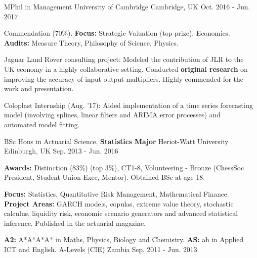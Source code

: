 

\begin{cventries}
  \cventry
    {MPhil in Management} %
    {University of Cambridge} %
    {Cambridge, UK} %
    {Oct. 2016 - Jun. 2017} %
    {
      \begin{cvitems} %
        \item {Commendation (70\%). \textbf{Focus:} Strategic Valuation (top prize), Economics. \textbf{Audits:} Measure Theory, Philosophy of Science, Physics.}
        \item {Jaguar Land Rover consulting project: Modeled the contribution of JLR to the UK economy in a highly collaborative setting. Conducted \textbf{original research} on improving the accuracy of input-output multipliers. Highly commended for the work and presentation.}
        \item {Coloplast Internship (Aug. '17): Aided implementation of a time series forecasting model (involving splines, linear filters and ARIMA error processes) and automated model fitting.}
      \end{cvitems}
    }

  \cventry
    {BSc Hons in Actuarial Science, \textbf{Statistics Major}} %
    {Heriot-Watt University} %
    {Edinburgh, UK} %
    {Sep. 2013 - Jun. 2016} %
    {
      \begin{cvitems} %
        \item {\textbf{Awards:} Distinction (83\%) (top 3\%), CT1-8, Volunteering - Bronze (ChessSoc President, Student Union Exec, Mentor). Obtained BSc at age 18.}
        \item {\textbf{Focus:} Statistics, Quantitative Risk Management, Mathematical Finance. \textbf{Project Areas:} GARCH models, copulas, extreme value theory, stochastic calculus, liquidity risk, economic scenario generators and advanced statistical inference. Published in the actuarial magazine.}
      \end{cvitems}
    }

  \cventry
    {\textbf{A2:} A*A*A*A* in Maths, Physics, Biology and Chemistry. \textbf{AS:} ab in Applied ICT and English.} %
    {A-Levels (CIE)} %
    {Zambia} %
    {Sep. 2011 - Jun. 2013} %
    {
    }

  \vspace{-5mm}

\end{cventries}
